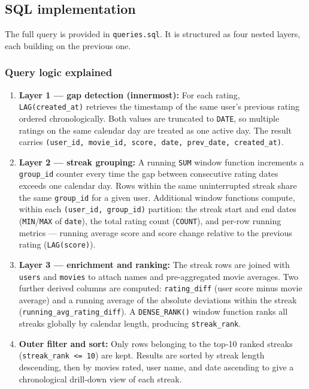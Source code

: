 \documentclass[11pt, a4paper]{article}
\begin{document}
\subsection{SQL implementation}

The full query is provided in \texttt{queries.sql}. It is structured as
four nested layers, each building on the previous one.

\subsubsection{Query logic explained}

\begin{enumerate}
    \item \textbf{Layer 1 --- gap detection (innermost):}
    For each rating, \texttt{LAG(created\_at)} retrieves the timestamp of
    the same user's previous rating ordered chronologically. Both values
    are truncated to \texttt{DATE}, so multiple ratings on the same
    calendar day are treated as one active day. The result carries
    \texttt{(user\_id, movie\_id, score, date, prev\_date, created\_at)}.

    \item \textbf{Layer 2 --- streak grouping:}
    A running \texttt{SUM} window function increments a \texttt{group\_id}
    counter every time the gap between consecutive rating dates exceeds one
    calendar day. Rows within the same uninterrupted streak share the same
    \texttt{group\_id} for a given user. Additional window functions
    compute, within each \texttt{(user\_id, group\_id)} partition:
    the streak start and end dates (\texttt{MIN}/\texttt{MAX} of
    \texttt{date}), the total rating count (\texttt{COUNT}), and
    per-row running metrics --- running average score and score change
    relative to the previous rating (\texttt{LAG(score)}).

    \item \textbf{Layer 3 --- enrichment and ranking:}
    The streak rows are joined with \texttt{users} and \texttt{movies} to
    attach names and pre-aggregated movie averages. Two further derived
    columns are computed: \texttt{rating\_diff} (user score minus movie
    average) and a running average of the absolute deviations within the
    streak (\texttt{running\_avg\_rating\_diff}). A
    \texttt{DENSE\_RANK()} window function ranks all streaks globally by
    calendar length, producing \texttt{streak\_rank}.

    \item \textbf{Outer filter and sort:}
    Only rows belonging to the top-10 ranked streaks
    (\texttt{streak\_rank <= 10}) are kept. Results are sorted by streak
    length descending, then by movies rated, user name, and date ascending
    to give a chronological drill-down view of each streak.
\end{enumerate}
\end{document}
